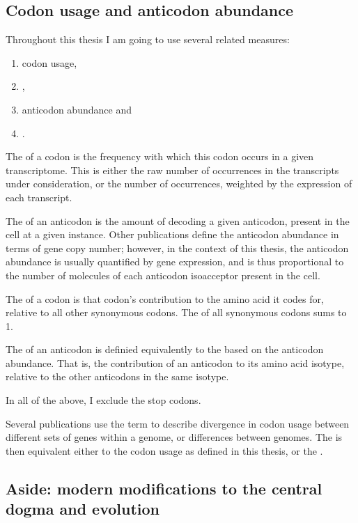 \subsection{Codon usage and anticodon abundance}

Throughout this thesis I am going to use several related measures:

\begin{enumerate}
    \item codon usage,
    \item \rcu,
    \item anticodon abundance and
    \item \raa.
\end{enumerate}

The  of a codon is the frequency with which this codon
occurs in a given transcriptome. This is either the raw number of occurrences in
the transcripts under consideration, or the number of occurrences, weighted by
the expression of each transcript.

The  of an anticodon is the amount of \trna
decoding a given anticodon, present in the cell at a given instance. Other
publications define the anticodon abundance in terms of \trna gene copy number;
however, in the context of this thesis, the anticodon abundance is usually
quantified by \trna gene expression, and is thus proportional to the number of
\trna molecules of each anticodon isoacceptor present in the cell.

The  of a codon is that codon’s contribution to the amino acid it
codes for, relative to all other synonymous codons. The \rcu of all synonymous
codons sums to \num{1}.

The  of an anticodon is definied equivalently to the \rcu based on
the anticodon abundance. That is, the contribution of an anticodon to its amino
acid isotype, relative to the other anticodons in the same isotype.

In all of the above, I exclude the stop codons.

Several publications use the term \cub to describe divergence in codon usage
between different sets of genes within a genome, or differences between genomes.
The \cub is then equivalent either to the codon usage as defined in this thesis,
or the \rcu.

\subsection{Aside: modern modifications to the central dogma and evolution}


